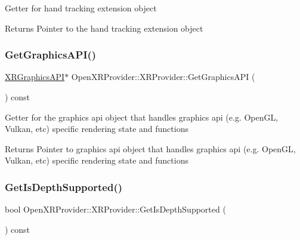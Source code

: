 Getter for hand tracking extension object \begin{DoxyReturn}{Returns}
Pointer to the hand tracking extension object 
\end{DoxyReturn}
\mbox{\label{class_open_x_r_provider_1_1_x_r_provider_aa88f602edaeecefe0d3c1e5072a5f4fc}} 
\subsubsection{\texorpdfstring{GetGraphicsAPI()}{GetGraphicsAPI()}}
{\footnotesize\ttfamily \mbox{\hyperlink{class_open_x_r_provider_1_1_x_r_graphics_a_p_i}{X\+R\+Graphics\+A\+PI}}$\ast$ Open\+X\+R\+Provider\+::\+X\+R\+Provider\+::\+Get\+Graphics\+A\+PI (\begin{DoxyParamCaption}{ }\end{DoxyParamCaption}) const\hspace{0.3cm}{\ttfamily [inline]}}

Getter for the graphics api object that handles graphics api (e.\+g. Open\+GL, Vulkan, etc) specific rendering state and functions \begin{DoxyReturn}{Returns}
Pointer to graphics api object that handles graphics api (e.\+g. Open\+GL, Vulkan, etc) specific rendering state and functions 
\end{DoxyReturn}
\mbox{\label{class_open_x_r_provider_1_1_x_r_provider_a20c6d026a126738127ed300039ff72e1}} 
\subsubsection{\texorpdfstring{GetIsDepthSupported()}{GetIsDepthSupported()}}
{\footnotesize\ttfamily bool Open\+X\+R\+Provider\+::\+X\+R\+Provider\+::\+Get\+Is\+Depth\+Supported (\begin{DoxyParamCaption}{ }\end{DoxyParamCaption}) const\hspace{0.3cm}{\ttfamily [inline]}}

